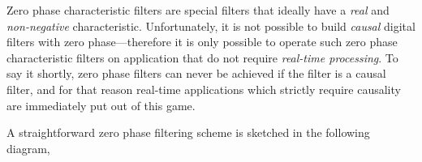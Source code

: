 \documentclass[\documentfontsize, twocolumn]{\classname}
\begin{document}
Zero phase characteristic filters are special filters that ideally have a \emph{real} and \emph{non-negative} characteristic. Unfortunately, it is not possible to build \emph{causal} digital filters with zero phase---therefore it is only possible to operate such zero phase characteristic filters on application that do not require \emph{real-time processing}. To say it shortly, zero phase filters can never be achieved if the filter is a causal filter, and for that reason real-time applications which strictly require causality are immediately put out of this game.

A straightforward zero phase filtering scheme is sketched in the following diagram,

\begin{center}
\end{center}
\end{document}
